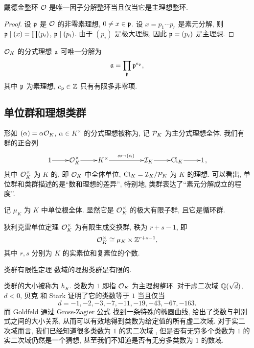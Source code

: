 \begin{corollary}{}{}
戴德金整环 ${\mathcal{O}}$ 是唯一因子分解整环当且仅当它是主理想整环.
\end{corollary}
\begin{proof}
设 ${\mathfrak{p}}$ 是 ${\mathcal{O}}$ 的非零素理想, $0\neq x\in{\mathfrak{p}}$. 设 $x=p_1\cdots p_r$ 是素元分解, 则 ${\mathfrak{p}}\mid (x)=\prod (p_i)$, ${\mathfrak{p}}\mid(p_i)$. 由于 $(p_i)$ 是极大理想, 因此 ${\mathfrak{p}}=(p_i)$ 是主理想.
\end{proof}

\begin{corollary}{}{}
${\mathcal{O}}_K$ 的分式理想 ${\mathfrak{a}}$ 可唯一分解为
  \[{\mathfrak{a}}=\prod_{{\mathfrak{p}}}{\mathfrak{p}}^{e_{\mathfrak{p}}},\]
其中 ${\mathfrak{p}}$ 为素理想, $e_{\mathfrak{p}}\in{\mathbb{Z}}$ 只有有限多非零项.
\end{corollary}

\subsection{单位群和理想类群}
形如 $(\alpha)=\alpha{\mathcal{O}}_K$, $\alpha\in K^\times$ 的分式理想被称为, 记 ${\mathcal{P}}_K$ 为主分式理想全体. 我们有群的正合列
  \[\xymatrix@1{
1\ar[r] &\CO_K^\times\ar[r] &K^\times \ar[rr]^{\alpha\mapsto (\alpha)} &&\CI_K\ar[r] &\Cl_K\ar[r] &1
},\]
其中 ${\mathcal{O}}_K^\times$ 为 $K$ 的, 即 ${\mathcal{O}}_K$ 中全体单位, ${\mathrm{Cl}}_K={\mathcal{I}}_K/{\mathcal{P}}_K$ 为 $K$ 的理想. 
可以看出, 单位群和类群描述的是``数和理想的差异'', 特别地, 类群表达了``素元分解成立的程度''. 

记 $\mu_K$ 为 $K$ 中单位根全体. 显然它是 ${\mathcal{O}}_K^\times$ 的极大有限子群, 且它是循环群. 
\begin{theorem}{狄利克雷单位定理}{}
${\mathcal{O}}_K^\times$ 为有限生成交换群, 秩为 $r+s-1$, 即
  \[{\mathcal{O}}_K^\times\cong \mu_K\times {\mathbb{Z}}^{r+s-1},\]
其中 $r,s$ 分别为 $K$ 的实素位和复素位的个数.
\end{theorem}

\begin{theorem}{类群有限性定理}{}
数域的理想类群是有限的.
\end{theorem}
类群的大小被称为 $h_K$. 类数为 $1$ 即指 ${\mathcal{O}}_K$ 为主理想整环. 对于虚二次域 ${\mathbb{Q}}(\sqrt{d})$, $d<0$, 贝克 \cite[I]{Baker1966} 和 Stark \cite{Stark1967} 证明了它的类数等于 $1$ 当且仅当
  \[d=-1,-2,-3,-7,-11,-19,-43,-67,-163.\]
而 Goldfeld \cite{Goldfeld1985} 通过 Gross-Zagier 公式 \cite{GrossZagier1986} 找到一条特殊的椭圆曲线, 给出了类数与判别式之间的大小关系, 从而可以有效地得到类数为给定值的所有虚二次域.
对于实二次域而言, 我们已经知道很多类数为 $1$ 的实二次域 \cite{MollinWilliams1991}, 但是否有无穷多个类数为 $1$ 的实二次域仍然是一个猜想, 甚至我们不知道是否有无穷多类数为 $1$ 的数域.

